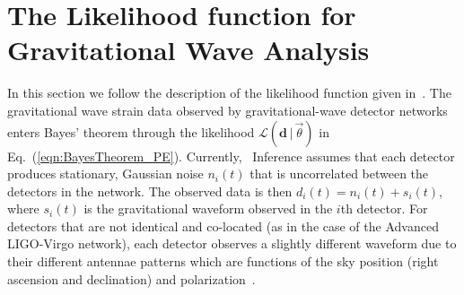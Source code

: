 \section{The Likelihood function for Gravitational Wave Analysis}
In this section we follow the description of the likelihood function
given in~\cite{biwer2019pycbc}.
The gravitational wave strain data observed by gravitational-wave detector networks
enters Bayes' theorem through the likelihood $\mathcal{L}(\mathbf{d} \, | \, \vec{\theta})$
 in Eq.~(\ref{eqn:BayesTheorem_PE}).
Currently, \pycbc{}\ Inference assumes that each detector produces stationary,
Gaussian noise $n_{i}(t)$ that is uncorrelated between the detectors in the
network. The observed data is then $d_{i}(t) = n_{i}(t) + s_{i}(t)$, where
$s_i(t)$ is the gravitational waveform observed in the $i$th detector.  For
detectors that are not identical and co-located (as in the case of the Advanced LIGO-Virgo network),
each detector observes a slightly different waveform due to their different antennae patterns
which are functions of the sky position (right ascension and declination) and polarization~\cite{Wahlquist:1987rx}.

